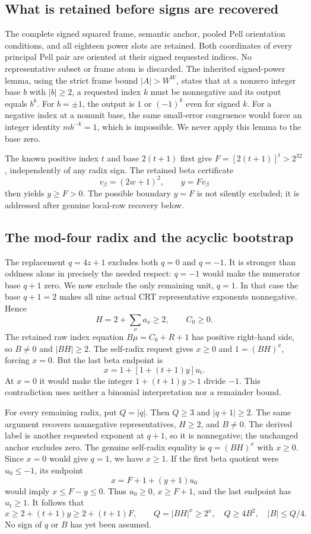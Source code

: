 \subsection{What is retained before signs are recovered}
The complete signed squared frame, semantic anchor, pooled Pell orientation
conditions, and all eighteen power slots are retained.  Both coordinates
of every principal Pell pair are oriented at their signed requested
indices.  No representative subset or frame atom is discarded.
The inherited signed-power lemma, using the strict frame bound
$|A|>W^W$, states that at a nonzero integer base $b$ with $|b|\ge2$, a
requested index $k$ must be nonnegative and its output equals $b^k$.
For $b=\pm1$, the output is $1$ or $(-1)^k$ even for signed $k$.
For a negative index at a nonunit base, the same small-error congruence
would force an integer identity $m b^{-k}=1$, which is impossible.
We never apply this lemma to the base zero.

The known positive index $t$ and base $2(t+1)$ first give
$F=[2(t+1)]^t>2^{32}$, independently of any radix sign.  The retained
beta certificate
\[
 v_\beta=(2w+1)^2,\qquad y=Fv_\beta
\]
then yields $y\ge F>0$.  The possible boundary $y=F$ is not silently
excluded; it is addressed after genuine local-row recovery below.

\subsection{The mod-four radix and the acyclic bootstrap}
The replacement $q=4z+1$ excludes both $q=0$ and $q=-1$.
It is stronger than oddness alone in precisely the needed respect:
$q=-1$ would make the numerator base $q+1$ zero.
We now exclude the only remaining unit, $q=1$.
In that case the base $q+1=2$ makes all nine actual CRT representative
exponents nonnegative.  Hence
\[
 H=2+\sum_\nu a_\nu\ge2,
 \qquad C_0\ge0.
\]
The retained raw index equation $B\mu=C_0+R+1$ has positive right-hand
side, so $B\ne0$ and $|BH|\ge2$.
The self-radix request gives $x\ge0$ and $1=(BH)^x$, forcing $x=0$.
But the last beta endpoint is
\[
 x=1+[1+(t+1)y]u_t.
\]
At $x=0$ it would make the integer $1+(t+1)y>1$ divide $-1$.
This contradiction uses neither a binomial interpretation nor a remainder
bound.

For every remaining radix, put $Q=|q|$.  Then $Q\ge3$ and
$|q+1|\ge2$.  The same argument recovers nonnegative representatives,
$H\ge2$, and $B\ne0$.  The derived label is another requested exponent
at $q+1$, so it is nonnegative; the unchanged anchor excludes zero.
The genuine self-radix equality is $q=(BH)^x$ with $x\ge0$.
Since $x=0$ would give $q=1$, we have $x\ge1$.
If the first beta quotient were $u_0\le-1$, its endpoint
\[
 x=F+1+(y+1)u_0
\]
would imply $x\le F-y\le0$.  Thus $u_0\ge0$, $x\ge F+1$, and the
last endpoint has $u_t\ge1$.  It follows that
\begin{equation}\label{eq:r20-q-size}
 x\ge2+(t+1)y\ge2+(t+1)F,\qquad
 Q=|BH|^x\ge2^x,\quad Q\ge4B^2,\quad |B|\le Q/4.
\end{equation}
No sign of $q$ or $B$ has yet been assumed.

